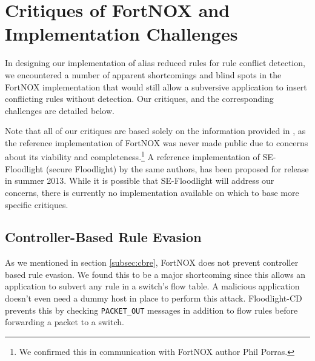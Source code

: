 \section{Critiques of FortNOX and Implementation Challenges}
\label{sec:critique}
In designing our implementation of alias reduced rules for rule conflict detection, we encountered a number of apparent shortcomings and blind spots in the FortNOX implementation that would still allow a subversive application to insert conflicting rules without detection. Our critiques, and the corresponding challenges are detailed below.

Note that all of our critiques are based solely on the information provided in \cite{Porras:2012:SEK:2342441.2342466}, as the reference implementation of FortNOX was never made public due to concerns about its viability and completeness.\footnote{We confirmed this in communication with FortNOX author Phil Porras.} A reference implementation of SE-Floodlight (secure Floodlight) by the same authors, has been proposed for release in summer 2013. While it is possible that SE-Floodlight will address our concerns, there is currently no implementation available on which to base more specific critiques.

\subsection{Controller-Based Rule Evasion}
As we mentioned in section \ref{subsec:cbre}, FortNOX does not prevent controller based rule evasion.
We found this to be a major shortcoming since this allows an application to subvert any rule in a switch's flow table.
A malicious application doesn't even need a dummy host in place to perform this attack.
Floodlight-CD prevents this by checking \texttt{PACKET\_OUT} messages in addition to flow rules before forwarding a packet to a switch. 

